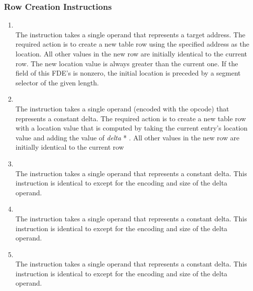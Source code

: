 \subsubsection{Row Creation Instructions}
\label{chap:rowcreationinstructions}
\begin{enumerate}[1. ]

\item \textbf{\DWCFAsetlocTARG} \\
The \DWCFAsetlocTARG{} instruction 
takes a single operand that
represents a target address. The required action is to create a
new table row using the specified address as the location. All
other values in the new row are initially identical to the
current row. The new location value is always greater than
the current one. 
If the  field of this FDE's 
is non\dash zero, the initial location is preceded by a segment
selector of the given length.


\item \textbf{\DWCFAadvancelocTARG} \\
The \DWCFAadvancelocTARG{} instruction takes a single operand (encoded
with the opcode) that represents a constant delta. The required
action is to create a new table row with a location value that
is computed by taking the current entry\textquoteright s location value
and adding the value of 
\textit{delta} * . 
All other values in the new row are initially identical to the
current row

\item \textbf{\DWCFAadvanceloconeTARG{}} \\
The \DWCFAadvanceloconeTARG{} instruction takes a single 
operand that represents a constant delta. This instruction
is identical to \DWCFAadvanceloc{} except for the encoding
and size of the delta operand.

\item \textbf{\DWCFAadvanceloctwoTARG} \\
The \DWCFAadvanceloctwoTARG{} instruction takes a single
operand that represents a constant delta. This instruction
is identical to \DWCFAadvanceloc{} except for the encoding
and size of the delta operand.

\item \textbf{\DWCFAadvancelocfourTARG} \\
The \DWCFAadvancelocfourTARG{} instruction takes a single
operand that represents a constant delta. This instruction
is identical to \DWCFAadvanceloc{} except for the encoding
and size of the delta operand.

\end{enumerate}

